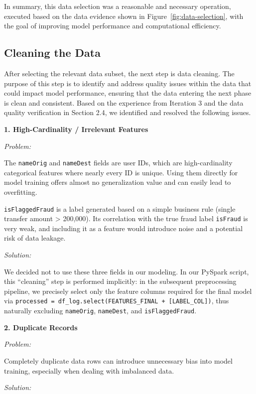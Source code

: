 \documentclass[sigplan,screen]{acmart}
\begin{document}
In summary, this data selection was a reasonable and necessary operation, executed based on the data evidence shown in Figure~\ref{fig:data-selection}, with the goal of improving model performance and computational efficiency.

\subsection{Cleaning the Data}

After selecting the relevant data subset, the next step is data cleaning. The purpose of this step is to identify and address quality issues within the data that could impact model performance, ensuring that the data entering the next phase is clean and consistent. Based on the experience from Iteration 3 and the data quality verification in Section 2.4, we identified and resolved the following issues.

\textbf{1. High-Cardinality / Irrelevant Features}

\textit{Problem:}

The \texttt{nameOrig} and \texttt{nameDest} fields are user IDs, which are high-cardinality categorical features where nearly every ID is unique. Using them directly for model training offers almost no generalization value and can easily lead to overfitting.

\texttt{isFlaggedFraud} is a label generated based on a simple business rule (single transfer amount > 200,000). Its correlation with the true fraud label \texttt{isFraud} is very weak, and including it as a feature would introduce noise and a potential risk of data leakage.

\textit{Solution:}

We decided not to use these three fields in our modeling. In our PySpark script, this ``cleaning'' step is performed implicitly: in the subsequent preprocessing pipeline, we precisely select only the feature columns required for the final model via \texttt{processed = df\_log.\allowbreak select(\allowbreak FEATURES\_FINAL + [LABEL\_COL])}, thus naturally excluding \texttt{nameOrig}, \texttt{nameDest}, and \texttt{isFlaggedFraud}.

\textbf{2. Duplicate Records}

\textit{Problem:}

Completely duplicate data rows can introduce unnecessary bias into model training, especially when dealing with imbalanced data.

\textit{Solution:}
\end{document}
